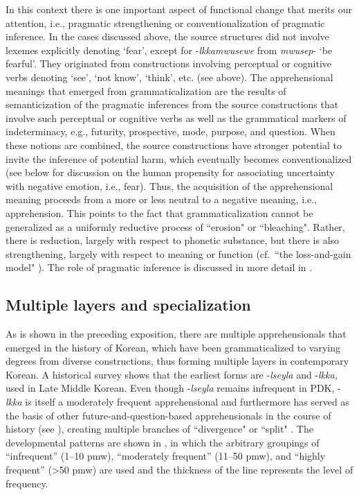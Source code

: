 \documentclass[output=paper,colorlinks,citecolor=brown]{langscibook}
\begin{document}
In this context there is one important aspect of functional change that merits our attention, i.e., pragmatic strengthening or conventionalization of pragmatic inference. In the cases discussed above, the source structures did not involve lexemes explicitly denoting `fear', except for \nobreakdash-\textit{lkkamwusewe} from \textit{mwusep}- `be fearful'. They originated from constructions involving perceptual or cognitive verbs denoting `see', `not know', `think', etc. (see  above). The apprehensional meanings that emerged from grammaticalization are the results of semanticization of the pragmatic inferences from the source constructions that involve such perceptual or cognitive verbs as well as the grammatical markers of indeterminacy, e.g., futurity, prospective, mode, purpose, and question. When these notions are combined, the source constructions have stronger potential to invite the inference of potential harm, which eventually becomes conventionalized (see  below for discussion on the human propensity for associating uncertainty with negative emotion, i.e., fear). Thus, the acquisition of the apprehensional meaning proceeds from a more or less neutral to a negative meaning, i.e., apprehension. This points to the fact that grammaticalization cannot be generalized as a uniformly reductive process of ``erosion" or ``bleaching". Rather, there is reduction, largely with respect to phonetic substance, but there is also strengthening, largely with respect to meaning or function (cf.\ ``the loss-and-gain model" \citep[109--111]{HeineEtAl1991}). The role of pragmatic inference is discussed in more detail in .


\subsection{Multiple layers and specialization}
\label{subsec:layersandspec}

As is shown in the preceding exposition, there are multiple apprehensionals that emerged in the history of Korean, which have been grammaticalized to varying degrees from diverse constructions, thus forming multiple layers in contemporary Korean. A historical survey shows that the earliest forms are \nobreakdash-\textit{lseyla} and \nobreakdash-\textit{lkka,} used in Late Middle Korean. Even though \nobreakdash-\textit{lseyla} remains infrequent in PDK, \nobreakdash-\textit{lkka} is itself a moderately frequent apprehensional and furthermore has served as the basis of other future-and-question-based apprehensionals in the course of history (see ), creating multiple branches of ``divergence" \citep{Hopper1991} or ``split" \citep{HeineReh1984}. The developmental patterns are shown in , in which the arbitrary groupings of ``infrequent'' (1--10 pmw), ``moderately frequent'' (11--50 pmw), and ``highly frequent'' (>50 pmw) are used and the thickness of the line represents the level of frequency.
\end{document}
